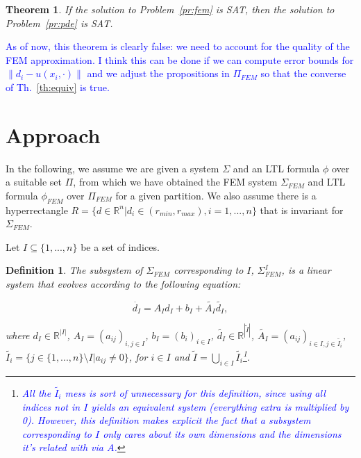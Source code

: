 \documentclass{article}
\newtheorem{theorem}{Theorem}
\newtheorem{definition}{Definition}
\newcommand*{\R}{\mathbb{R}}
\newcommand*{\fran}[1]{\textcolor{blue}{#1}}
\begin{document}
\begin{theorem}
    If the solution to Problem~\ref{pr:fem} is SAT, then the solution to
    Problem~\ref{pr:pde} is SAT.
\end{theorem}

\fran{As of now, this theorem is clearly false: we need to account for the
quality of the FEM approximation. I think this can be done if 
we can compute error bounds for $\|d_i - u(x_i, \cdot)\|$ and we adjust the
propositions in $\Pi_{FEM}$ so that the converse of Th.~\ref{th:equiv} is true.}

\section{Approach}

In the following, we assume we are given a system $\Sigma$ and an LTL formula
$\phi$ over a suitable set $\Pi$, from which we have obtained the 
FEM system $\Sigma_{FEM}$ and LTL formula $\phi_{FEM}$ over $\Pi_{FEM}$ for a
given partition. We also assume there is a hyperrectangle $R = \{d \in \R^n |
d_i \in (r_{min}, r_{max}), i = 1,...,n\}$ that is invariant for $\Sigma_{FEM}$.

Let $I \subseteq \{1,...,n\}$ be a set of indices. 

\begin{definition}

The subsystem of $\Sigma_{FEM}$ corresponding to $I$,
$\Sigma_{FEM}^I$, is a linear system that evolves according to the following
equation:

\begin{equation}
    \dot{d_I} = A_I d_I + b_I + \tilde{A_I}\tilde{d_I},
\end{equation}

where $d_I \in \R^{|I|}$, $A_I = (a_{ij})_{i, j \in I}$, $b_I = (b_i)_{i
\in I}$, $\tilde{d_I} \in \R^{|\tilde{I}|} $, $\tilde{A_I} = (a_{ij})_{i \in I, j
\in \tilde{I_i}}$, $\tilde{I_i} = \{j \in \{1,...,n\} \setminus I | a_{ij} \neq 0\}$, for $i
\in I$ and $\tilde{I} = \bigcup_{i \in I} \tilde{I_i}$\footnote{\fran{All the
$\tilde{I_i}$ mess is sort of unnecessary for this definition, since using all
indices not in $I$ yields an equivalent system (everything extra is multiplied
by 0). However, this definition makes explicit the fact that a subsystem
corresponding to $I$ only cares about its own dimensions and the dimensions it's
related with via $A$.}}.

\end{definition}
\end{document}
